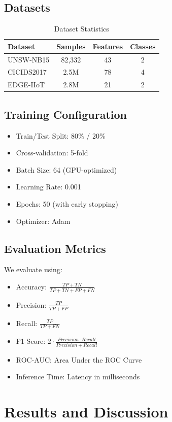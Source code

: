 \documentclass[conference]{IEEEtran}
\begin{document}
\subsection{Datasets}
\begin{table}[h]
\caption{Dataset Statistics}
\centering
\begin{tabular}{|l|c|c|c|}
\hline
\textbf{Dataset} & \textbf{Samples} & \textbf{Features} & \textbf{Classes} \\
\hline
UNSW-NB15 & 82,332 & 43 & 2 \\
CICIDS2017 & 2.5M & 78 & 4 \\
EDGE-IIoT & 2.8M & 21 & 2 \\
\hline
\end{tabular}
\label{tab:datasets}
\end{table}

\subsection{Training Configuration}
\begin{itemize}
    \item Train/Test Split: 80\% / 20\%
    \item Cross-validation: 5-fold
    \item Batch Size: 64 (GPU-optimized)
    \item Learning Rate: 0.001
    \item Epochs: 50 (with early stopping)
    \item Optimizer: Adam
\end{itemize}

\subsection{Evaluation Metrics}
We evaluate using:
\begin{itemize}
    \item Accuracy: $\frac{TP+TN}{TP+TN+FP+FN}$
    \item Precision: $\frac{TP}{TP+FP}$
    \item Recall: $\frac{TP}{TP+FN}$
    \item F1-Score: $2 \cdot \frac{Precision \cdot Recall}{Precision + Recall}$
    \item ROC-AUC: Area Under the ROC Curve
    \item Inference Time: Latency in milliseconds
\end{itemize}

\section{Results and Discussion}
\end{document}
